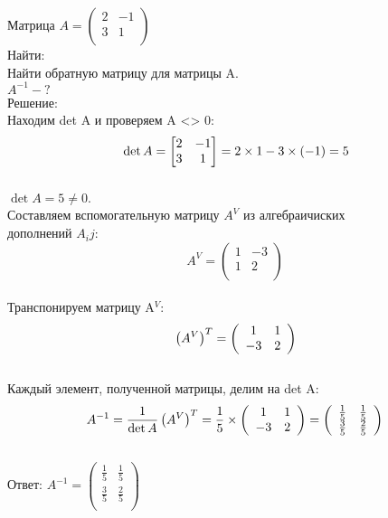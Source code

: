 \documentclass[a4paper,12pt]{article} %
\begin{document}
Матрица ${A} =
\left( \begin{array}{cc}
2 & -1  \\
3 & 1 \\
\end{array} \right)$ \\
Найти: \\
Найти обратную матрицу для матрицы A.\\
$A^{-1} - ?$ \\
Решение: \\
Находим det A и проверяем A <> 0: \\
\begin{displaymath}
\\
\det A = \begin{bmatrix}
2 & -1\\
3 & 1 \\
\end{bmatrix} = 2 \times 1 - 3 \times (-1) = 5
\end{displaymath}\\
$\det A = 5 \neq 0.$\\
Составляем вспомогательную матрицу $A^{V}$ из алгебраичиских\\
дополнений $A_{i}{j}$:
\begin{displaymath}
    A^{V} = \left(\begin{array}{cc}
    1 & -3  \\
    1 & 2 \\
  \end{array} \right)
\end{displaymath}\\
Транспонируем матрицу A$^{V}$:
\begin{displaymath}
\\
    \left(A^{V} \right)^{T}  = \left(\begin{array}{cc}
    1 & 1  \\
    -3 & 2 \\
  \end{array} \right)
\end{displaymath} \\
Каждый элемент, полученной матрицы, делим на det A: 
\begin{displaymath}
\\
    A^{-1}  = \frac{1}{\det A}\left(A^{V}\right)^{T} = \frac{1}{5} \times
    \left(\begin{array}{cc}
    1 & 1  \\
    -3 & 2 \\
  \end{array} \right) = 
   \left(\begin{array}{cc}
    \frac{1}{5} & \frac{1}{5}  \\
    \frac{3}{5} & \frac{2}{5} \\
  \end{array} \right) 
\end{displaymath} \\
Ответ: ${A}^{-1} = \left(\begin{array}{cc}
    \frac{1}{5} & \frac{1}{5}  \\
    \frac{3}{5} & \frac{2}{5} \\
  \end{array} \right) $
\end{document}
